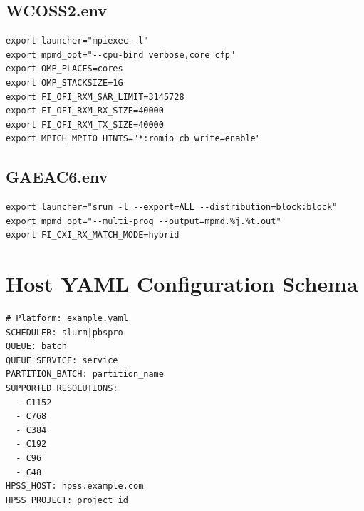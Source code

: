 \documentclass[11pt,a4paper,twoside]{article}
\begin{document}
\subsection{WCOSS2.env}

\begin{lstlisting}[style=bashstyle]
export launcher="mpiexec -l"
export mpmd_opt="--cpu-bind verbose,core cfp"
export OMP_PLACES=cores
export OMP_STACKSIZE=1G
export FI_OFI_RXM_SAR_LIMIT=3145728
export FI_OFI_RXM_RX_SIZE=40000
export FI_OFI_RXM_TX_SIZE=40000
export MPICH_MPIIO_HINTS="*:romio_cb_write=enable"
\end{lstlisting}

\subsection{GAEAC6.env}

\begin{lstlisting}[style=bashstyle]
export launcher="srun -l --export=ALL --distribution=block:block"
export mpmd_opt="--multi-prog --output=mpmd.%j.%t.out"
export FI_CXI_RX_MATCH_MODE=hybrid
\end{lstlisting}

\section{Host YAML Configuration Schema}
\label{app:yaml}

\begin{lstlisting}[style=bashstyle,caption={Host YAML Template}]
# Platform: example.yaml
SCHEDULER: slurm|pbspro
QUEUE: batch
QUEUE_SERVICE: service
PARTITION_BATCH: partition_name
SUPPORTED_RESOLUTIONS:
  - C1152
  - C768
  - C384
  - C192
  - C96
  - C48
HPSS_HOST: hpss.example.com
HPSS_PROJECT: project_id
\end{lstlisting}

\end{document}
